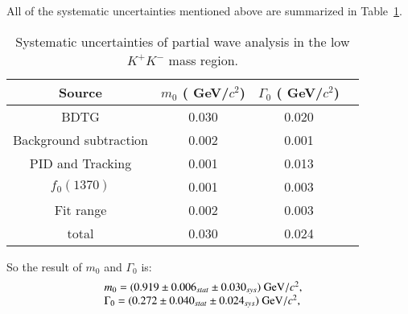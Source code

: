 {    All of the systematic uncertainties mentioned above are summarized in Table~\ref{MIPWA-Sys}.
    \begin{table}[htbp]
        \caption{Systematic uncertainties of partial wave analysis in the low $K^{+}K^{-}$ mass region.}
        \label{MIPWA-Sys}
        \begin{center}
            \begin{tabular}{cccc}
                \toprule\toprule
                Source   &                                                      $m_{0}$ ( GeV/$c^{2}$)  &$\Gamma_{0}$ ( GeV/$c^{2}$)\\
                \hline
                 BDTG                     & 0.030                  &   0.020 \\
                 Background subtraction   & 0.002                  &   0.001 \\
                 PID and Tracking         & 0.001                  &   0.013 \\
                 $f_{0}(1370)$            & 0.001                  &   0.003 \\
                 Fit range                & 0.002                  &   0.003 \\
                
                \hline
                total                                   & 0.030                  &   0.024\\
                \bottomrule\bottomrule
            \end{tabular}
        \end{center}
    \end{table}
    So the result of $m_{0}$ and $\Gamma_{0}$ is:
    \begin{equation}
        \begin{array}{lr}
            m_{0} = (0.919 \pm 0.006_{stat} \pm 0.030_{sys}) \ {\rm GeV}/c^{2}, &\\
            \Gamma_{0} = (0.272 \pm 0.040_{stat} \pm 0.024_{sys})\ {\rm GeV}/c^{2}, &
        \end{array}\label{S-wave-sys} 
    \end{equation}
    
}
